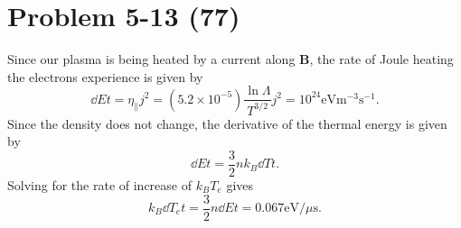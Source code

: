 %

\section*{Problem 5-13 (77)}
\label{sec:5-13}
Since our plasma is being heated by a current along \(\bm{B} \), the rate of Joule heating the electrons experience is given by
\begin{equation*}
	\dd{E}{t} = \eta_{\parallel}j^2 = (5.2\times 10^{-5}) \dfrac{\ln \Lambda}{T^{3/2}}j^2 = 10^{24}\text{eV}\text{m}^{-3}\text{s}^{-1}.
\end{equation*}
Since the density does not change, the derivative of the thermal energy is given by
\begin{equation*}
	\dd{E}{t} = \dfrac{3}{2}nk_B\dd{T}{t}.
\end{equation*}
Solving for the rate of increase of \(k_BT_e \) gives
\begin{equation*}
	k_B\dd{T_e}{t} = \dfrac{3}{2}n\dd{E}{t} = 0.067 \text{eV}/\mu\text{s}.
\end{equation*}

